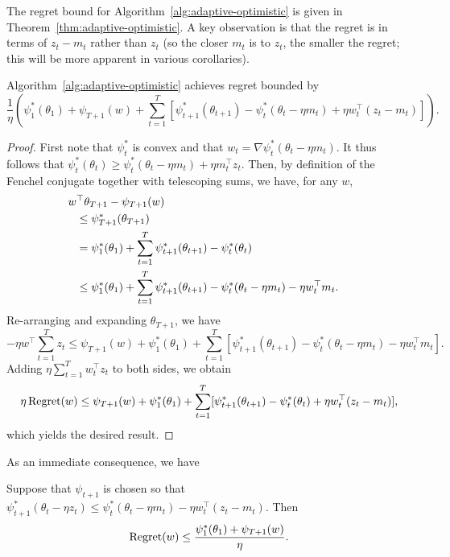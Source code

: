 \documentclass[paper_icml.tex]{subfiles}
\begin{document}
The regret bound for Algorithm~\ref{alg:adaptive-optimistic} is 
given in Theorem~\ref{thm:adaptive-optimistic}. A key observation is that 
the regret is in terms of $z_t - m_t$ rather than $z_t$ (so the closer 
$m_t$ is to $z_t$, the smaller the regret; this will be more apparent 
in various corollaries).
\begin{theorem}
\label{thm:adaptive-optimistic}
Algorithm~\ref{alg:adaptive-optimistic} achieves regret bounded by
\begin{dmath}
\label{eqn:regret-1}
\frac{1}{\eta}\left(\psi_1^*(\theta_1) + \psi_{T+1}(w) + \sum_{t=1}^{T} \left[\psi_{t+1}^*(\theta_{t+1}) - \psi_t^*(\theta_t - \eta m_t) + \eta w_t^{\top}(z_t-m_t)\right]\right).
\end{dmath}
\end{theorem}
\begin{proof}
First note that $\psi_t^*$ is convex and that 
$w_t = \nabla \psi_t^*(\theta_t - \eta m_t)$. It thus follows that 
$\psi_t^*(\theta_t) \geq \psi_t^*(\theta_t - \eta m_t) + \eta m_t^{\top}z_t$. 
Then, by definition of the Fenchel conjugate together with telescoping sums, we 
have, for any $w$, 
\begin{align*}
\lefteqn{\hskip -0.1in w^{\top}\theta_{T+1} - \psi_{T+1}(w)} \\
\hskip 0.1in  &\leq \psi_{T+1}^*(\theta_{T+1}) \\
  &= \psi_1^*(\theta_1) + \sum_{t=1}^{T} \psi_{t+1}^*(\theta_{t+1}) - \psi_t^*(\theta_t) \\
  &\leq \psi_1^*(\theta_1) + \sum_{t=1}^{T} \psi_{t+1}^*(\theta_{t+1}) - \psi_t^*(\theta_t-\eta m_t) - \eta w_t^{\top}m_t.
\end{align*}
Re-arranging and expanding $\theta_{T+1}$, we have
\begin{dmath}
-\eta w^{\top} \sum_{t=1}^T z_t \leq \psi_{T+1}(w) + \psi_1^*(\theta_1) + \sum_{t=1}^{T} [\psi_{t+1}^*(\theta_{t+1}) - \psi_t^*(\theta_t-\eta m_t) - \eta w_t^{\top}m_t].
\end{dmath}
Adding $\eta \sum_{t=1}^T w_t^{\top}z_t$ to both sides, we obtain
\begin{dmath}
\eta \Regret(w) \leq \psi_{T+1}(w) + \psi_1^*(\theta_1) + \sum_{t=1}^T [\psi_{t+1}^*(\theta_{t+1}) - \psi_t^*(\theta_t) + \eta w_t^{\top}(z_t-m_t)],
\end{dmath}
which yields the desired result.
\end{proof}
As an immediate consequence, we have
\begin{corollary}
\label{cor:a-o1}
Suppose that $\psi_{t+1}$ is chosen so that $\psi_{t+1}^*(\theta_t - \eta z_t) \leq \psi_t^*(\theta_t - \eta m_t) - \eta w_t^{\top}(z_t - m_t)$. Then
\begin{equation}
\operatorname{Regret}(w) \leq \frac{\psi_1^*(\theta_1) + \psi_{T+1}(w)}{\eta}.
\end{equation}
\end{corollary}
\end{document}
